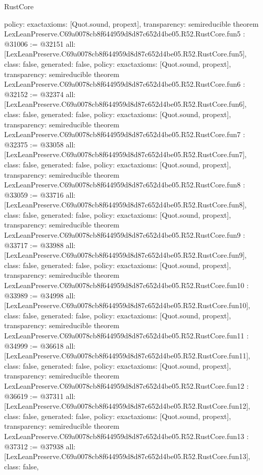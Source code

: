 \begin{lexlean}{RustCore}
\begin{coremodule}
{  policy: exact{axioms: [Quot.sound, propext]},
  transparency: semireducible
}
theorem LexLeanPreserve.C69a0078cb8f644959d8d87c652d4be05.R52.RustCore.fun5 : @31006 := @32151 {
  all: [LexLeanPreserve.C69a0078cb8f644959d8d87c652d4be05.R52.RustCore.fun5],
  class: false,
  generated: false,
  policy: exact{axioms: [Quot.sound, propext]},
  transparency: semireducible
}
theorem LexLeanPreserve.C69a0078cb8f644959d8d87c652d4be05.R52.RustCore.fun6 : @32152 := @32374 {
  all: [LexLeanPreserve.C69a0078cb8f644959d8d87c652d4be05.R52.RustCore.fun6],
  class: false,
  generated: false,
  policy: exact{axioms: [Quot.sound, propext]},
  transparency: semireducible
}
theorem LexLeanPreserve.C69a0078cb8f644959d8d87c652d4be05.R52.RustCore.fun7 : @32375 := @33058 {
  all: [LexLeanPreserve.C69a0078cb8f644959d8d87c652d4be05.R52.RustCore.fun7],
  class: false,
  generated: false,
  policy: exact{axioms: [Quot.sound, propext]},
  transparency: semireducible
}
theorem LexLeanPreserve.C69a0078cb8f644959d8d87c652d4be05.R52.RustCore.fun8 : @33059 := @33716 {
  all: [LexLeanPreserve.C69a0078cb8f644959d8d87c652d4be05.R52.RustCore.fun8],
  class: false,
  generated: false,
  policy: exact{axioms: [Quot.sound, propext]},
  transparency: semireducible
}
theorem LexLeanPreserve.C69a0078cb8f644959d8d87c652d4be05.R52.RustCore.fun9 : @33717 := @33988 {
  all: [LexLeanPreserve.C69a0078cb8f644959d8d87c652d4be05.R52.RustCore.fun9],
  class: false,
  generated: false,
  policy: exact{axioms: [Quot.sound, propext]},
  transparency: semireducible
}
theorem LexLeanPreserve.C69a0078cb8f644959d8d87c652d4be05.R52.RustCore.fun10 : @33989 := @34998 {
  all: [LexLeanPreserve.C69a0078cb8f644959d8d87c652d4be05.R52.RustCore.fun10],
  class: false,
  generated: false,
  policy: exact{axioms: [Quot.sound, propext]},
  transparency: semireducible
}
theorem LexLeanPreserve.C69a0078cb8f644959d8d87c652d4be05.R52.RustCore.fun11 : @34999 := @36618 {
  all: [LexLeanPreserve.C69a0078cb8f644959d8d87c652d4be05.R52.RustCore.fun11],
  class: false,
  generated: false,
  policy: exact{axioms: [Quot.sound, propext]},
  transparency: semireducible
}
theorem LexLeanPreserve.C69a0078cb8f644959d8d87c652d4be05.R52.RustCore.fun12 : @36619 := @37311 {
  all: [LexLeanPreserve.C69a0078cb8f644959d8d87c652d4be05.R52.RustCore.fun12],
  class: false,
  generated: false,
  policy: exact{axioms: [Quot.sound, propext]},
  transparency: semireducible
}
theorem LexLeanPreserve.C69a0078cb8f644959d8d87c652d4be05.R52.RustCore.fun13 : @37312 := @37938 {
  all: [LexLeanPreserve.C69a0078cb8f644959d8d87c652d4be05.R52.RustCore.fun13],
  class: false,
}
\end{coremodule}
\end{lexlean}
